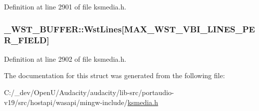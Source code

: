 Definition at line 2901 of file ksmedia.\+h.

\subsubsection[{\texorpdfstring{Wst\+Lines}{WstLines}}]{ \+\_\+\+W\+S\+T\+\_\+\+B\+U\+F\+F\+E\+R\+::\+Wst\+Lines\mbox{[}{\bf M\+A\+X\+\_\+\+W\+S\+T\+\_\+\+V\+B\+I\+\_\+\+L\+I\+N\+E\+S\+\_\+\+P\+E\+R\+\_\+\+F\+I\+E\+LD}\mbox{]}}\hypertarget{struct___w_s_t___b_u_f_f_e_r_a04171f685d65cb8f56d5c7f714b7372f}{}\label{struct___w_s_t___b_u_f_f_e_r_a04171f685d65cb8f56d5c7f714b7372f}


Definition at line 2902 of file ksmedia.\+h.



The documentation for this struct was generated from the following file\+:\begin{DoxyCompactItemize}
\item 
C\+:/\+\_\+dev/\+Open\+U/\+Audacity/audacity/lib-\/src/portaudio-\/v19/src/hostapi/wasapi/mingw-\/include/\hyperlink{ksmedia_8h}{ksmedia.\+h}\end{DoxyCompactItemize}

